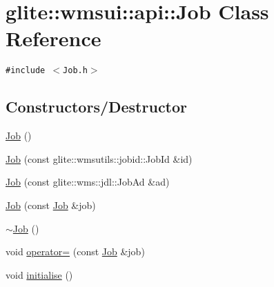 \hypertarget{classglite_1_1wmsui_1_1api_1_1Job}{
\section{glite::wmsui::api::Job Class Reference}
\label{classglite_1_1wmsui_1_1api_1_1Job}
}
{\tt \#include $<$Job.h$>$}

\subsection*{Constructors/Destructor}
\begin{CompactItemize}
\item 
\hyperlink{classglite_1_1wmsui_1_1api_1_1Job_z15_0}{Job} ()
\item 
\hyperlink{classglite_1_1wmsui_1_1api_1_1Job_z15_1}{Job} (const glite::wmsutils::jobid::Job\-Id \&id)
\item 
\hyperlink{classglite_1_1wmsui_1_1api_1_1Job_z15_2}{Job} (const glite::wms::jdl::Job\-Ad \&ad)
\item 
\hyperlink{classglite_1_1wmsui_1_1api_1_1Job_z15_3}{Job} (const \hyperlink{classglite_1_1wmsui_1_1api_1_1Job}{Job} \&job)
\item 
\hyperlink{classglite_1_1wmsui_1_1api_1_1Job_z15_4}{$\sim$Job} ()
\item 
void \hyperlink{classglite_1_1wmsui_1_1api_1_1Job_z15_5}{operator=} (const \hyperlink{classglite_1_1wmsui_1_1api_1_1Job}{Job} \&job)
\item 
void \hyperlink{classglite_1_1wmsui_1_1api_1_1Job_z15_6}{initialise} ()
\end{CompactItemize}
